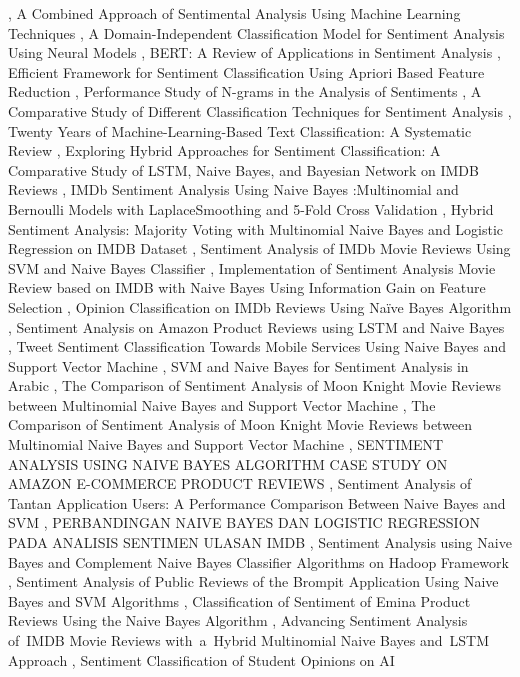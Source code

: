 \documentclass{article}
\begin{document}
\cite{baarslan2021sentimentfa026eca}, A Combined Approach of Sentimental Analysis Using Machine Learning Techniques \cite{gupta2023combined9632e9b1}, A Domain-Independent Classification Model for Sentiment Analysis Using Neural Models \cite{jnoub2020domainindependentbc6a4e2b}, BERT: A Review of Applications in Sentiment Analysis \cite{sayeed2023bert678d1641}, Efficient Framework for Sentiment Classification Using Apriori Based Feature Reduction \cite{jain2018efficientdf1b7bd2}, Performance Study of N-grams in the Analysis of Sentiments \cite{ojo2021performanceb18b3098}, A Comparative Study of Different Classification Techniques for Sentiment Analysis \cite{ghosh2020comparative0d185490}, Twenty Years of Machine-Learning-Based Text Classification: A Systematic Review \cite{palanivinayagam2023twentyf98b0ff7}, Exploring Hybrid Approaches for Sentiment Classification: A Comparative Study of LSTM, Naive Bayes, and Bayesian Network on IMDB Reviews \cite{reddy2025exploringf74fbe8e}, IMDb Sentiment Analysis Using Naive Bayes :Multinomial and Bernoulli Models with LaplaceSmoothing and 5-Fold Cross Validation \cite{mishra2025imdb53a34975}, Hybrid Sentiment Analysis: Majority Voting with Multinomial Naive Bayes and Logistic Regression on IMDB Dataset \cite{zakaria2023hybrid9f347a22}, Sentiment Analysis of IMDb Movie Reviews Using SVM and Naive Bayes Classifier \cite{subedi2025sentiment4d1e1933}, Implementation of Sentiment Analysis Movie Review based on IMDB with Naive Bayes Using Information Gain on Feature Selection \cite{mahyarani2021implementation92725ed4}, Opinion Classification on IMDb Reviews Using Naïve Bayes Algorithm \cite{putri2025opinion5a9abee2}, Sentiment Analysis on Amazon Product Reviews using LSTM and Naive Bayes \cite{meghana2023sentiment07e1ff10}, Tweet Sentiment Classification Towards Mobile Services Using Naive Bayes and Support Vector Machine \cite{muharram2025tweet16e8b037}, SVM and Naive Bayes for Sentiment Analysis in Arabic \cite{mohamed2022svm467a111d}, The Comparison of Sentiment Analysis of Moon Knight Movie Reviews between Multinomial Naive Bayes and Support Vector Machine \cite{paperndcomparisoneeaa2824}, The Comparison of Sentiment Analysis of Moon Knight Movie Reviews between Multinomial Naive Bayes and Support Vector Machine \cite{paperndcomparison449db446}, SENTIMENT ANALYSIS  USING NAIVE BAYES  ALGORITHM  CASE  STUDY ON AMAZON  E-COMMERCE  PRODUCT  REVIEWS \cite{rahman2025sentimentf05200fe}, Sentiment Analysis of Tantan Application Users: A Performance Comparison Between Naive Bayes and SVM \cite{andini2025sentimentbab5ad43}, PERBANDINGAN NAIVE BAYES DAN LOGISTIC REGRESSION PADA ANALISIS SENTIMEN ULASAN IMDB \cite{elvina2026perbandingan1009c644}, Sentiment Analysis using Naive Bayes and Complement Naive Bayes Classifier Algorithms on Hadoop Framework \cite{seref2018sentiment122903c0}, Sentiment Analysis of Public Reviews of the Brompit Application Using Naive Bayes and SVM Algorithms \cite{affandi2026sentimentc63a31c8}, Classification of Sentiment of Emina Product Reviews Using the Naive Bayes Algorithm \cite{astriani2025classificationb0008571}, Advancing Sentiment Analysis of IMDB Movie Reviews with a Hybrid Multinomial Naive Bayes and LSTM Approach \cite{papadimitriou2024advancing9c718735}, Sentiment Classification of Student Opinions on AI 
\end{document}
